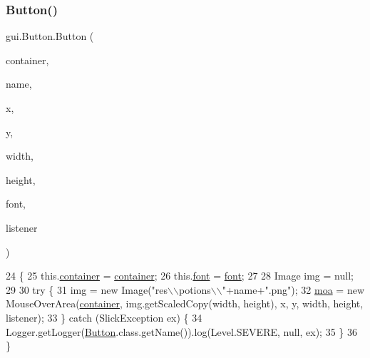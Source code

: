 \subsubsection{\texorpdfstring{Button()}{Button()}\hspace{0.1cm}{\footnotesize\ttfamily [1/4]}}
{\footnotesize\ttfamily gui.\+Button.\+Button (\begin{DoxyParamCaption}\item[{\mbox{\hyperlink{classorg_1_1newdawn_1_1slick_1_1_game_container}{Game\+Container}}}]{container,  }\item[{String}]{name,  }\item[{int}]{x,  }\item[{int}]{y,  }\item[{int}]{width,  }\item[{int}]{height,  }\item[{\mbox{\hyperlink{classgui_1_1_g_u_i_font}{G\+U\+I\+Font}}}]{font,  }\item[{\mbox{\hyperlink{interfaceorg_1_1newdawn_1_1slick_1_1gui_1_1_component_listener}{Component\+Listener}}}]{listener }\end{DoxyParamCaption})\hspace{0.3cm}{\ttfamily [inline]}}


\begin{DoxyCode}
24     \{
25         this.\mbox{\hyperlink{classgui_1_1_button_a91cd8f6ba1fa010f564dcbc4561ce9a7}{container}} = \mbox{\hyperlink{classgui_1_1_button_a91cd8f6ba1fa010f564dcbc4561ce9a7}{container}};
26         this.\mbox{\hyperlink{classgui_1_1_button_a7f22b2fc3bd45d47a55a2d3ef20e5452}{font}} = \mbox{\hyperlink{classgui_1_1_button_a7f22b2fc3bd45d47a55a2d3ef20e5452}{font}};
27 
28         Image img = null;
29 
30         \textcolor{keywordflow}{try} \{
31             img = \textcolor{keyword}{new} Image(\textcolor{stringliteral}{"res\(\backslash\)\(\backslash\)potions\(\backslash\)\(\backslash\)"}+name+\textcolor{stringliteral}{".png"});
32             \mbox{\hyperlink{classgui_1_1_button_abccfc83b8fee5280bf5022b3b211054e}{moa}} = \textcolor{keyword}{new} MouseOverArea(\mbox{\hyperlink{classgui_1_1_button_a91cd8f6ba1fa010f564dcbc4561ce9a7}{container}}, img.getScaledCopy(width, height), x, y, width, 
      height, listener);
33         \} \textcolor{keywordflow}{catch} (SlickException ex) \{
34             Logger.getLogger(\mbox{\hyperlink{classgui_1_1_button_a9d43604fe7ed9d76404abba348ff731e}{Button}}.class.getName()).log(Level.SEVERE, null, ex);
35         \}
36     \}
\end{DoxyCode}
\mbox{\label{classgui_1_1_button_a63b4d24c1da8b52b6ea75d6e885e1140}} 
